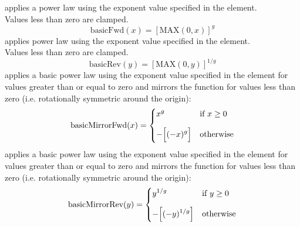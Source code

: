 \begin{xmlfields}
        \begin{xmlfields}
            \xmlitemd["basicFwd"] applies a power law using the exponent value specified in the  element. \\
            Values less than zero are clamped.
                \begin{equation} \label{eq:expBasicFwd}
                    \text{basicFwd}(x) = [\text{MAX}(0, x)]^{g}
                \end{equation}          
            \xmlitemd["basicRev"] applies power law using the exponent value specified in the  element. \\
            Values less than zero are clamped.
                \begin{equation} \label{eq:expBasicRev}
                    \text{basicRev}(y) = [\text{MAX}(0, y)]^{1/g}
                \end{equation}
            \xmlitemd["basicMirrorFwd"] applies a basic power law using the exponent value specified in the  element for values greater than or equal to zero and mirrors the function for values less than zero (i.e. rotationally symmetric around the origin):
                \begin{equation} \label{eq:expbasicMirrorFwd}
                    \text{basicMirrorFwd}(x) = 
                        \begin{dcases}
                            x^{g} & \text{if } x \geq 0 \\[6pt]
                            -\Big[(-x)^{g}\Big] & \text{otherwise}
                        \end{dcases}                \end{equation}          
            \xmlitemd["basicMirrorRev"] applies a basic power law using the exponent value specified in the  element for values greater than or equal to zero and mirrors the function for values less than zero (i.e. rotationally symmetric around the origin):
                \begin{equation} \label{eq:expbasicMirrorRev}
                    \text{basicMirrorRev}(y) = 
                        \begin{dcases}
                            y^{1/g} & \text{if } y \geq 0 \\[6pt]
                            -\Big[(-y)^{1/g}\Big] & \text{otherwise}
                        \end{dcases}
                \end{equation}

\end{xmlfields}
\end{xmlfields}
